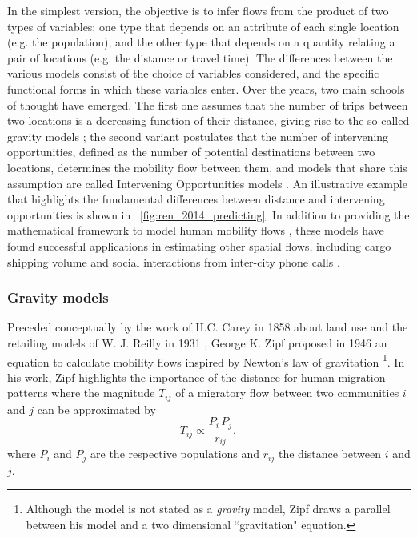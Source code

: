 In the simplest version, the objective is to infer flows from the product of two types of variables: one type that depends on an attribute of each single location (e.g. the population), and the other type that depends on a quantity relating a pair of locations (e.g. the distance or travel time). 
The differences between the various models consist of the choice of variables considered, and the specific functional forms in which these variables enter.
%
Over the years, two main schools of thought have emerged. 
The first one assumes that the number of trips between two locations is 
a decreasing function of 
their distance, giving rise to the so-called gravity models \cite{carey_1858_principles,zipf_1946_p1}; the second variant postulates that the number of intervening opportunities, defined as the number of potential destinations between two locations, determines the mobility flow between them, and models that share this assumption are called Intervening Opportunities models \cite{stouffer_1940_intervening}. 
%
An illustrative example that highlights the fundamental differences between distance and intervening opportunities is shown in \figurename~\ref{fig:ren_2014_predicting}. In addition to providing the mathematical framework to model human mobility flows \cite{barthelemy_2011_spatial,thiemann_2010_structure,jung_2008_gravity}, these models have found successful applications in estimating other spatial flows, including cargo shipping volume \cite{kaluza_2010_complex} and social interactions from inter-city phone calls \cite{krings_2009_urban,p._2011_uncovering}.

\subsubsection{Gravity models}
\label{sec:gravity}

Preceded conceptually by the work of H.C. Carey in 1858 about land use \cite{carey_1858_principles} and the retailing models of W. J. Reilly in 1931 \cite{reilly_1931_law}, George K. Zipf proposed in 1946 an equation to calculate mobility flows inspired by Newton's law of gravitation \cite{zipf_1946_p1}\footnote{Although the model is not stated as a \emph{gravity} model, Zipf draws a parallel between his model and a two dimensional ``gravitation" equation.}. In his work, Zipf highlights the importance of the distance for human migration patterns where the magnitude $T_{ij}$ of a migratory flow between two communities $i$ and $j$ can be approximated by 
\begin{equation}
T_{ij} \propto \frac{P_{i} \, P_{j}}{r_{ij}} ,
\end{equation}
where $P_{i}$ and $P_{j}$ are the respective populations and $r_{ij}$ the distance between $i$ and $j$.


